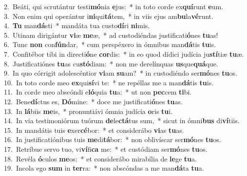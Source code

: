 {2.~}Beáti, qui scrutántur testi\textbf{mó}nia \textbf{e}jus:~* in toto corde ex\textbf{quí}runt \textbf{e}um.\\
{3.~}Non enim qui operántur i\textbf{ni}qui\textbf{tá}tem,~* in viis ejus am\textbf{bu}la\textbf{vé}runt.\\
{4.~}\textbf{Tu} man\textbf{dá}sti~* mandáta tua custo\textbf{dí}ri \textbf{ni}mis.\\
{5.~}Utinam dirigántur \textbf{vi}æ \textbf{me}æ,~* ad custodiéndas justificati\textbf{ó}nes \textbf{tu}as!\\
{6.~}Tunc \textbf{non} con\textbf{fún}dar,~* cum perspéxero in ómnibus man\textbf{dá}tis \textbf{tu}is.\\
{7.~}Confitébor tibi in directi\textbf{ó}ne \textbf{cor}dis:~* in eo quod dídici judícia ju\textbf{stí}tiæ \textbf{tu}æ.\\
{8.~}Justificatiónes \textbf{tu}as cu\textbf{stó}diam:~* non me derelínquas \textbf{us}que\textbf{quá}que.\\
{9.~}In quo córrigit adolescéntior \textbf{vi}am \textbf{su}am?~* in custodiéndo ser\textbf{mó}nes \textbf{tu}os.\\
{10.~}In toto corde meo \textbf{ex}qui\textbf{sí}vi te:~* ne repéllas me a man\textbf{dá}tis \textbf{tu}is.\\
{11.~}In corde meo abscóndi e\textbf{ló}quia \textbf{tu}a:~* ut non \textbf{pec}cem \textbf{ti}bi.\\
{12.~}Bene\textbf{dí}ctus es, \textbf{Dó}mine:~* doce me justificati\textbf{ó}nes \textbf{tu}as.\\
{13.~}In \textbf{lá}biis \textbf{me}is,~* pronuntiávi ómnia judícia \textbf{o}ris \textbf{tu}i.\\
{14.~}In via testimoniórum tuórum \textbf{de}le\textbf{ctá}tus sum,~* sicut in ómni\textbf{bus} di\textbf{ví}tiis.\\
{15.~}In mandátis tuis \textbf{e}xer\textbf{cé}bor:~* et considerábo \textbf{vi}as \textbf{tu}as.\\
{16.~}In justificatiónibus tuis \textbf{me}di\textbf{tá}bor:~* non oblivíscar ser\textbf{mó}nes \textbf{tu}os.\\
{17.~}Retríbue servo tuo, vi\textbf{ví}fi\textbf{ca} me:~* et custódiam ser\textbf{mó}nes \textbf{tu}os.\\
{18.~}Revéla \textbf{ó}culos \textbf{me}os:~* et considerábo mirabília de \textbf{le}ge \textbf{tu}a.\\
{19.~}Incola ego \textbf{sum} in \textbf{ter}ra:~* non abscóndas a me man\textbf{dá}ta \textbf{tu}a.\\
